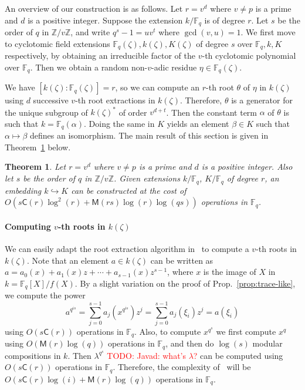 \documentclass[12pt]{article}
\theoremstyle{plain}
\newtheorem{theorem}{Theorem}
\theoremstyle{definition}
\newcommand{\todo}[1]{\textcolor{red}{TODO: #1}}
\def\Z{\ensuremath{\mathbb{Z}}}
\def\F{\ensuremath{\mathbb{F}}}
\def\MM{\ensuremath{\mathsf{M}}}
\def\CC{\ensuremath{\mathsf{C}}}
\newcounter{algorithm}
\begin{document}
An overview of our construction is as follows. Let $r = v^d$ where $v \ne p$ is a 
prime and $d$ is a positive integer. Suppose the extension $k/\F_q$ is of degree $r$. Let $s$ be 
the order of $q$ in $\Z / v\Z$, and write $q^s - 1 = uv^t$ where $\gcd(v, u) = 1$. We first move to 
cyclotomic field extensions $\F_q(\zeta), k(\zeta), K(\zeta)$ of degree $s$ over $\F_q, k, K$ respectively, by 
obtaining an irreducible factor of the $v$-th cyclotomic polynomial over $\F_q$. Then we obtain a  
random non-$v$-adic residue $\eta \in \F_q(\zeta)$.

We have $[k(\zeta): \F_q(\zeta)] = r$, so we can 
compute an $r$-th root $\theta$ of $\eta$ in $k(\zeta)$ using $d$ successive $v$-th 
root extractions in $k(\zeta)$. Therefore, $\theta$ is a generator for the unique subgroup of 
$k(\zeta)^*$ of order $v^{d + t}$. Then the constant term $\alpha$ of $\theta$ is such that $k = 
\F_q(\alpha)$. %
Doing the same in $K$ yields an element $\beta\in K$ such that
$\alpha\mapsto\beta$ defines an isomorphism. %
The main result of this section is given in Theorem~\ref{theorem:isom-root} below.

\begin{theorem}
	\label{theorem:isom-root}
	Let $r = v^d$ where $v \ne p$ is a prime and $d$ is a positive integer. Also let $s$ be the 
	order of $q$ in $\Z / v\Z$. Given extensions $k/\F_q$, $K/\F_q$ of degree $r$, an
        embedding $k\hookrightarrow K$ can be constructed at the cost of 
	$O(s\CC(r)\log^2(r) + \MM(rs)\log(r)\log(qs))$ operations in $\F_q$.
\end{theorem}


\paragraph{Computing $v$-th roots in $k(\zeta)$}
We can easily adapt the root extraction algorithm in~\cite{doliskanischost2011} to compute a $v$-th 
roots in $k(\zeta)$. Note that an element $a \in k(\zeta)$ can be written as $a = a_0(x) + a_1(x)z 
+ \cdots + a_{s - 	1}(x)z^{s - 1}$, 
where $x$ is the image of $X$ in $k=\F_q[X]/f(X)$.
By a slight variation on the proof of Prop.~\ref{prop:trace-like}, we compute the power
\[a^{q^{is}} = \sum_{j = 0}^{s - 1} a_j(x^{q^{is}})z^j = \sum_{j = 0}^{s - 1} a_j(\xi_i)z^j = 
a(\xi_i)\]
using $O(s\CC(r))$ operations in $\F_q$. Also, to compute $x^{q^s}$ we first compute 
$x^q$ using $O(\MM(r)\log(q))$ operations in $\F_q$, and then do $\log(s)$ modular compositions in 
$k$. Then $\lambda^{q^s}$ \todo{Javad: what's $\lambda$?} can be computed using $O(s\CC(r))$ operations in $\F_q$. Therefore, the 
complexity of~\cite[Algorithm~2]{doliskanischost2011} will be $O(s\CC(r)\log(i) + 
\MM(r)\log(q))$ operations in $\F_q$.
\end{document}
